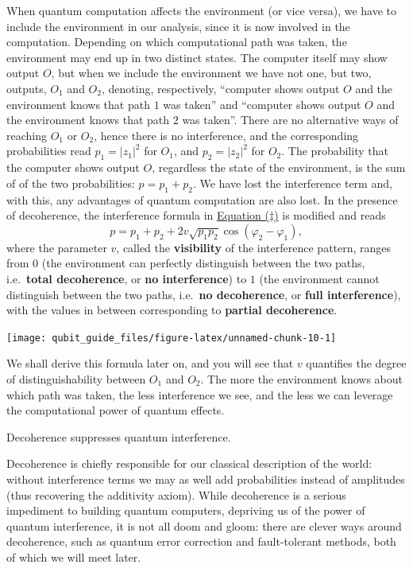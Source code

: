 \documentclass[fleqn,a4paper]{article}
\newenvironment{idea}{\everypar{\setlength{\parindent}{1.5em}}}{}
\theoremstyle{definition}
\theoremstyle{definition}
\theoremstyle{definition}
\theoremstyle{definition}
\theoremstyle{remark}
\begin{document}
When quantum computation affects the environment (or vice versa), we have to include the environment in our analysis, since it is now involved in the computation.
Depending on which computational path was taken, the environment may end up in two distinct states.
The computer itself may show output \(O\), but when we include the environment we have not one, but two, outputs, \(O_1\) and \(O_2\), denoting, respectively, ``computer shows output \(O\) and the environment knows that path \(1\) was taken'' and ``computer shows output \(O\) and the environment knows that path \(2\) was taken''.
There are no alternative ways of reaching \(O_1\) or \(O_2\), hence there is no interference, and the corresponding probabilities read \(p_1=|z_1|^2\) for \(O_1\), and \(p_2=|z_2|^2\) for \(O_2\).
The probability that the computer shows output \(O\), regardless the state of the environment, is the sum of of the two probabilities: \(p=p_1+p_2\).
We have lost the interference term and, with this, any advantages of quantum computation are also lost.
In the presence of decoherence, the interference formula in \protect\hyperlink{the-double-slit-experiment}{Equation (\(\ddagger\))} is modified and reads
\[
p = p_1 + p_2 + 2 v \sqrt{p_1 p_2}\cos (\varphi_2-\varphi_1),
\]
where the parameter \(v\), called the \textbf{visibility} of the interference pattern, ranges from \(0\) (the environment can perfectly distinguish between the two paths, i.e.~\textbf{total decoherence}, or \textbf{no interference}) to \(1\) (the environment cannot distinguish between the two paths, i.e.~\textbf{no decoherence}, or \textbf{full interference}), with the values in between corresponding to \textbf{partial decoherence}.

\begin{center}\texttt{[image: qubit\_guide\_files/figure-latex/unnamed-chunk-10-1]} \end{center}

We shall derive this formula later on, and you will see that \(v\) quantifies the degree of distinguishability between \(O_1\) and \(O_2\).
The more the environment knows about which path was taken, the less interference we see, and the less we can leverage the computational power of quantum effects.

\begin{idea}
Decoherence suppresses quantum interference.

\end{idea}

Decoherence is chiefly responsible for our classical description of the world: without interference terms we may as well add probabilities instead of amplitudes (thus recovering the additivity axiom).
While decoherence is a serious impediment to building quantum computers, depriving us of the power of quantum interference, it is not all doom and gloom: there are clever ways around decoherence, such as quantum error correction and fault-tolerant methods, both of which we will meet later.
\end{document}
